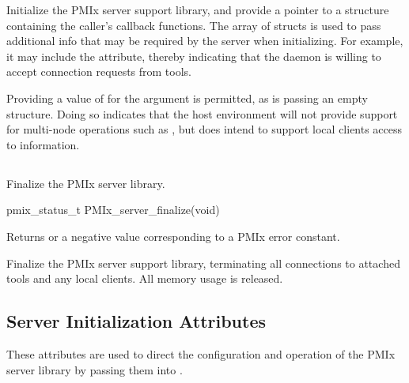 \optattrend

\descr

Initialize the \ac{PMIx} server support library, and provide a pointer to a  structure containing the caller's callback functions.
The array of  structs is used to pass additional info that may be required by the server when initializing.
For example, it may include the  attribute, thereby indicating that the daemon is willing to accept connection requests from tools.

\advicermstart
Providing a value of  for the  argument is permitted, as is passing an empty  structure. Doing so indicates that the host environment will not provide support for multi-node operations such as , but does intend to support local clients access to information.
\advicermend

\subsection{}

\summary

Finalize the PMIx server library.

\format

\cspecificstart
\begin{codepar}
pmix_status_t
PMIx_server_finalize(void)
\end{codepar}
\cspecificend

Returns  or a negative value corresponding to a PMIx error constant.

\descr

Finalize the \ac{PMIx} server support library, terminating all connections to attached tools and any local clients.
All memory usage is released.

\subsection{Server Initialization Attributes}
\label{chap:api_init:serverattrs}

These attributes are used to direct the configuration and operation of the \ac{PMIx} server library by passing them into .

%

